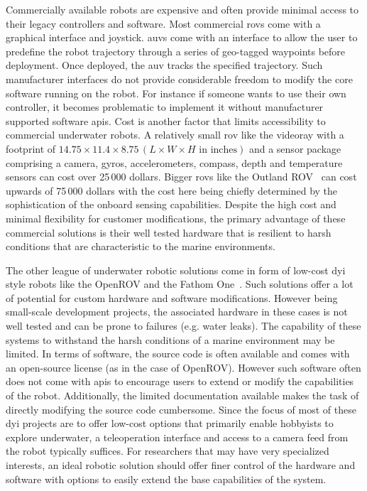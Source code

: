 Commercially available robots are expensive and often provide minimal access to their legacy controllers and software. Most commercial \gls{rov}s come with a graphical interface and joystick. \gls{auv}s come with an interface to allow the user to predefine the robot trajectory through a series of geo-tagged waypoints before deployment. Once deployed, the \gls{auv} tracks the specified trajectory. Such manufacturer interfaces do not provide considerable freedom to modify the core software running on the robot. For instance if someone wants to use their own controller, it becomes problematic to implement it without manufacturer supported software \gls{api}s. Cost is another factor that limits accessibility to commercial underwater robots. A relatively small \gls{rov} like the videoray \cite{videoray} with a footprint of $14.75\times 11.4\times 8.75 \,(L\times W\times H \text{ in inches})$ and a sensor package comprising a camera, gyros, accelerometers, compass, depth and temperature sensors can cost 
over 25\,000 dollars. Bigger \gls{rov}s like the Outland ROV~\cite{outlandrov} can cost upwards of 75\,000 dollars with the cost here being chiefly determined by the sophistication of the onboard sensing capabilities. Despite the high cost and minimal flexibility for customer modifications, the primary advantage of these commercial solutions is their well tested hardware that is resilient to harsh conditions that are characteristic to the marine environments.

The other league of underwater robotic solutions come in form of low-cost \gls{dyi} style robots like the OpenROV \cite{openrov} and the Fathom One~\cite{fathomrov}. Such solutions offer a lot of potential for custom hardware and software modifications. However being small-scale development projects, the associated hardware in these cases is not well tested and can be prone to failures (e.g. water leaks). The capability of these systems to withstand the harsh conditions of a marine environment may be limited. In terms of software, the source code is often available and comes with an open-source license (as in the case of OpenROV). However such software often does not come with \gls{api}s to encourage users to extend or modify the capabilities of the robot. Additionally, the limited documentation available makes the task of directly modifying the source code cumbersome. Since the focus of most of these \gls{dyi} projects are to offer low-cost options that primarily enable hobbyists to explore underwater, a 
teleoperation 
interface and access to a camera feed from the robot typically suffices. For researchers that may have very specialized interests, an ideal robotic solution should offer finer control of the hardware and software with options to easily extend the base capabilities of the system.

